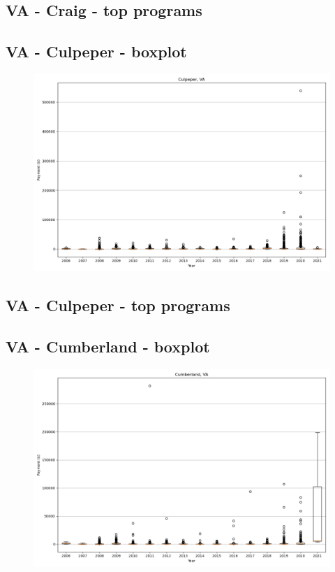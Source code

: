 \subsection*{VA - Craig - top programs}

\newpage
\subsection*{VA - Culpeper - boxplot}
\begin{figure}[h]
\centering
\includegraphics[width=7in]{../output/boxplots/counties/Culpeper-VA_boxplot.png}
\end{figure}


\subsection*{VA - Culpeper - top programs}

\newpage
\subsection*{VA - Cumberland - boxplot}
\begin{figure}[h]
\centering
\includegraphics[width=7in]{../output/boxplots/counties/Cumberland-VA_boxplot.png}
\end{figure}


